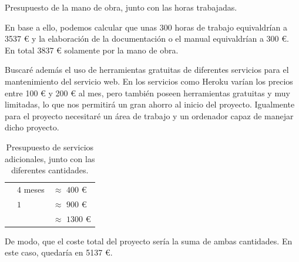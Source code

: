 \begin{table}[h]
    \caption[Presupuesto de la mano de obra]{Presupuesto de la mano de obra, junto con las horas trabajadas.}\label{table:presupuesto-obra-de-mano}

\end{table}

En base a ello, podemos calcular que unas 300 horas de trabajo equivaldrían a 3537 € y la elaboración de la documentación o el manual equivaldrían a 300 €. En total 3837 € solamente por la mano de obra.

\vspace{0.3cm}

Buscaré además el uso de herramientas gratuitas de diferentes servicios para el mantenimiento del servicio web. En los servicios como Heroku varían los precios entre 100 € y 200 € al mes, pero también poseen herramientas gratuitas y muy limitadas, lo que nos permitirá un gran ahorro al inicio del proyecto. Igualmente para el proyecto necesitaré un área de trabajo y un ordenador capaz de manejar dicho proyecto.

\vspace{0.3cm}

\begin{table}[h]

    \centering
    \setlength\arrayrulewidth{0.8pt}

    \begin{tabular}{ >{\centering\arraybackslash}m{1.2in} | >{\centering\arraybackslash}m{0.8in} | >{\centering\arraybackslash}m{0.8in} |}

    \cline{2-3}
                                                                              & \cellcolor{RoyalBlue}{Cantidad} & \cellcolor{RoyalBlue}{Coste} \\ \hline
    \multicolumn{1}{|c|}{\cellcolor{RoyalBlue}\textbf{Espacio de trabajo}} & $4$ meses                                                 & $\approx$ $400$ €                                                \\ \hline
    \multicolumn{1}{|c|}{\cellcolor{RoyalBlue}\textbf{Ordenador}}          & $1$                                                       & $\approx$ $900$ €                                                \\ \hline
    \multicolumn{1}{|c|}{\cellcolor{RoyalBlue}\textbf{Total}}              &                                                         & $\approx$ $1300$ €                                               \\ \hline
    \end{tabular}

    \caption[Presupuesto de servicios adicionales]{Presupuesto de servicios adicionales, junto con las diferentes cantidades.}\label{table:presupuesto-adicional}

\end{table}

De modo, que el coste total del proyecto sería la suma de ambas cantidades. En este caso, quedaría en 5137 €.